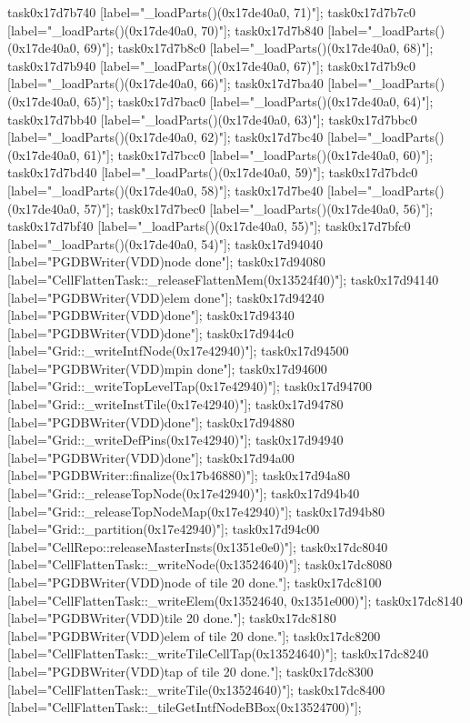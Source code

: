 {	task0x17d7b740 [label="_loadParts()(0x17de40a0, 71)"];
	task0x17d7b7c0 [label="_loadParts()(0x17de40a0, 70)"];
	task0x17d7b840 [label="_loadParts()(0x17de40a0, 69)"];
	task0x17d7b8c0 [label="_loadParts()(0x17de40a0, 68)"];
	task0x17d7b940 [label="_loadParts()(0x17de40a0, 67)"];
	task0x17d7b9c0 [label="_loadParts()(0x17de40a0, 66)"];
	task0x17d7ba40 [label="_loadParts()(0x17de40a0, 65)"];
	task0x17d7bac0 [label="_loadParts()(0x17de40a0, 64)"];
	task0x17d7bb40 [label="_loadParts()(0x17de40a0, 63)"];
	task0x17d7bbc0 [label="_loadParts()(0x17de40a0, 62)"];
	task0x17d7bc40 [label="_loadParts()(0x17de40a0, 61)"];
	task0x17d7bcc0 [label="_loadParts()(0x17de40a0, 60)"];
	task0x17d7bd40 [label="_loadParts()(0x17de40a0, 59)"];
	task0x17d7bdc0 [label="_loadParts()(0x17de40a0, 58)"];
	task0x17d7be40 [label="_loadParts()(0x17de40a0, 57)"];
	task0x17d7bec0 [label="_loadParts()(0x17de40a0, 56)"];
	task0x17d7bf40 [label="_loadParts()(0x17de40a0, 55)"];
	task0x17d7bfc0 [label="_loadParts()(0x17de40a0, 54)"];
	task0x17d94040 [label="PGDBWriter(VDD)\nCell node done"];
	task0x17d94080 [label="CellFlattenTask::_releaseFlattenMem(0x13524f40)"];
	task0x17d94140 [label="PGDBWriter(VDD)\nCell elem done"];
	task0x17d94240 [label="PGDBWriter(VDD)\nTap done"];
	task0x17d94340 [label="PGDBWriter(VDD)\nTile done"];
	task0x17d944c0 [label="Grid::_writeIntfNode(0x17e42940)"];
	task0x17d94500 [label="PGDBWriter(VDD)\nNormal mpin done"];
	task0x17d94600 [label="Grid::_writeTopLevelTap(0x17e42940)"];
	task0x17d94700 [label="Grid::_writeInstTile(0x17e42940)"];
	task0x17d94780 [label="PGDBWriter(VDD)\nibb done"];
	task0x17d94880 [label="Grid::_writeDefPins(0x17e42940)"];
	task0x17d94940 [label="PGDBWriter(VDD)\nmpin done"];
	task0x17d94a00 [label="PGDBWriter::finalize(0x17b46880)"];
	task0x17d94a80 [label="Grid::_releaseTopNode(0x17e42940)"];
	task0x17d94b40 [label="Grid::_releaseTopNodeMap(0x17e42940)"];
	task0x17d94b80 [label="Grid::_partition(0x17e42940)"];
	task0x17d94c00 [label="CellRepo::releaseMasterInsts(0x1351e0e0)"];
	task0x17dc8040 [label="CellFlattenTask::_writeNode(0x13524640)"];
	task0x17dc8080 [label="PGDBWriter(VDD)\nCell node of tile 20 done."];
	task0x17dc8100 [label="CellFlattenTask::_writeElem(0x13524640, 0x1351e000)"];
	task0x17dc8140 [label="PGDBWriter(VDD)\nCell tile 20 done."];
	task0x17dc8180 [label="PGDBWriter(VDD)\nCell elem of tile 20 done."];
	task0x17dc8200 [label="CellFlattenTask::_writeTileCellTap(0x13524640)"];
	task0x17dc8240 [label="PGDBWriter(VDD)\nCell tap of tile 20 done."];
	task0x17dc8300 [label="CellFlattenTask::_writeTile(0x13524640)"];
	task0x17dc8400 [label="CellFlattenTask::_tileGetIntfNodeBBox(0x13524700)"];
}
